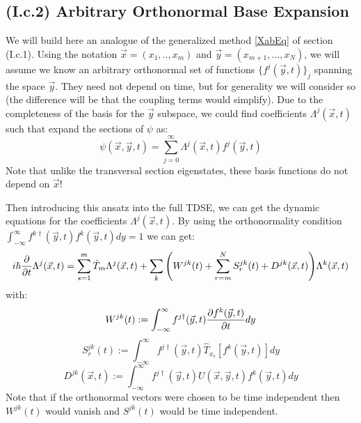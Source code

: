 \documentclass[11pt, a4paper]{article} %
\begin{document}
\subsection*{(I.c.2) Arbitrary Orthonormal Base Expansion}
We will build here an analogue of the generalized method \eqref{XabEq} of section (I.c.1). Using the notation $\vec{x}=(x_1,..,x_m)$ and $\vec{y}=(x_{m+1},...,x_N)$, we will assume we know an arbitrary orthonormal set of functions $\{ f^j(\vec{y},t) \}_j$ spanning the space $\vec{y}$. They need not depend on time, but for generality we will consider so (the difference will be that the coupling terms would simplify). Due to the completeness of the basis for the $\vec{y}$ subspace, we could find coefficients $\Lambda^j(\vec{x},t)$ such that expand the sections of $\psi$ as:\vspace{-0.3cm}
\begin{equation}
\psi(\vec{x},\vec{y},t)=\sum_{j=0}^\infty \Lambda^j(\vec{x},t) f^j(\vec{y},t)
\end{equation}\vspace{-0.3cm}
Note that unlike the transversal section eigenstates, these basis functions do not depend on $\vec{x}$!

Then introducing this ansatz into the full TDSE, we can get the dynamic equations for the coefficients $\Lambda^j(\vec{x},t)$. By using the orthonormality condition $\int_{-\infty}^{\infty}f^{k\dagger}(\vec{y},t)f^k(\vec{y},t)dy=1$ we can get:\vspace{-0.2cm}
\begin{equation}
i\hbar \pdv{}{t}\Lambda^j(\vec{x},t)= \sum_{s=1}^m \hat{T}_m \Lambda^j(\vec{x},t) + \sum_k \qty( W^{jk}(t)+\sum_{r=m}^NS^{jk}_r(t)+D^{jk}(\vec{x},t) )\Lambda^k(\vec{x},t)
\end{equation}
with:\vspace{-0.3cm}
\begin{equation}
W^{jk}(t):=\int_{-\infty}^{\infty}f^{j\dagger}(\vec{y},t) \pdv{f^k(\vec{y},t)}{t} dy
\end{equation}
\begin{equation}
S^{jk}_r(t):=\int_{-\infty}^{\infty}f^{j\dagger}(\vec{y},t) \hat{T}_{x_s}[f^k(\vec{y},t)] dy
\end{equation}
\begin{equation}
D^{jk}(\vec{x},t):=\int_{-\infty}^{\infty}f^{j\dagger}(\vec{y},t)U(\vec{x},\vec{y},t) f^k(\vec{y},t) dy
\end{equation}
Note that if the orthonormal vectors were chosen to be time independent then $W^{jk}(t)$ would vanish and $S^{jk}(t)$ would be time independent. 
\end{document}
